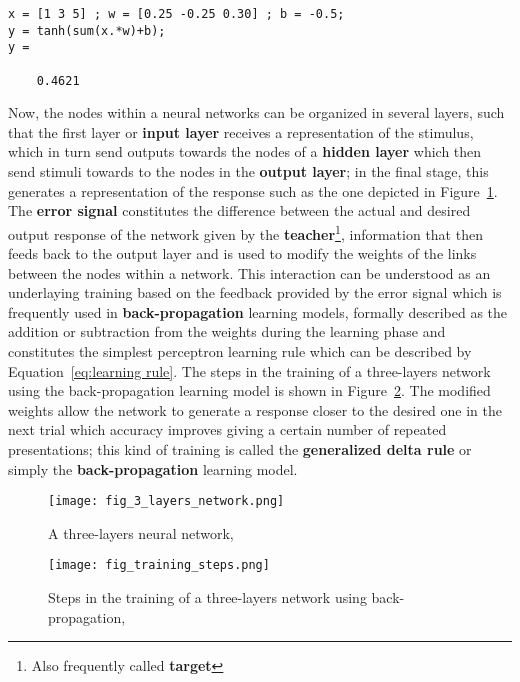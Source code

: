 \documentclass{WileySev}
\begin{document}
\begin{lstlisting}
x = [1 3 5] ; w = [0.25 -0.25 0.30] ; b = -0.5;
y = tanh(sum(x.*w)+b);
y =

    0.4621
\end{lstlisting}

Now, the nodes within a neural networks can be organized in several layers, such that the first layer or \textbf{input layer} receives a representation of the stimulus, which in turn send outputs towards the nodes of a \textbf{hidden layer} which then send stimuli towards to the nodes in the \textbf{output layer}; in the final stage, this generates a representation of the response such as the one depicted in Figure~\ref{fig:three_layers}. The \textbf{error signal} constitutes the difference between the actual and desired output response of the network given by the \textbf{teacher}\footnote{Also frequently called \textbf{target}}, information that then feeds back to the output layer and is used to modify the weights of the links between the nodes within a network. This interaction can be understood as an underlaying training based on the feedback provided by the error signal which is frequently used in \textbf{back-propagation} learning models, formally described as the addition or subtraction from the weights during the learning phase and constitutes the simplest perceptron learning rule which can be described by Equation~\ref{eq:learning rule}. The steps in the training of a three-layers network using the back-propagation learning model is shown in Figure~\ref{fig:training_steps}. The modified weights allow the network to generate a response closer to the desired one in the next trial which accuracy improves giving a certain number of repeated presentations; this kind of training is called the \textbf{generalized delta rule} or simply the \textbf{back-propagation} learning model.

\begin{figure}
  \texttt{[image: fig\_3\_layers\_network.png]}
  \centering
  \caption{A three-layers neural network, \cite{friedenberg2011cognitive}}
  \label{fig:three_layers}
\end{figure}

\begin{figure}
  \texttt{[image: fig\_training\_steps.png]}
  \centering
  \caption{Steps in the training of a three-layers network using back-propagation, \cite{friedenberg2011cognitive}}
  \label{fig:training_steps}
\end{figure}
\end{document}
